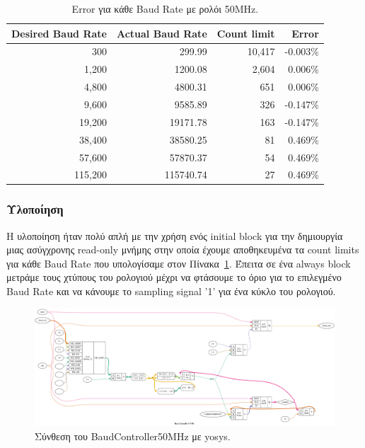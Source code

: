 \documentclass[../main.tex]{subfiles}
\begin{document}
\begin{table}[H]
  \renewcommand{\arraystretch}{1.3}
  \caption{Error για κάθε Baud Rate με ρολόι 50MHz.}
  \label{tab:baudrate}
  \centering
  \begin{tabular}{rrrr}
    \hline
    \bf Desired Baud Rate & \bf Actual Baud Rate & \bf Count limit & \bf Error \\
    \hline\hline
                      300 &               299.99 &          10,417 &    -0.003\% \\
                    1,200 &              1200.08 &           2,604 &     0.006\% \\
                    4,800 &              4800.31 &             651 &     0.006\% \\
                    9,600 &              9585.89 &             326 &    -0.147\% \\
                   19,200 &             19171.78 &             163 &    -0.147\% \\
                   38,400 &             38580.25 &              81 &     0.469\% \\
                   57,600 &             57870.37 &              54 &     0.469\% \\
                  115,200 &            115740.74 &              27 &     0.469\% \\
    \hline
  \end{tabular}
\end{table}

\subsubsection*{Υλοποίηση}

Η υλοποίηση ήταν πολύ απλή με την χρήση ενός initial block για την δημιουργία
μιας ασύγχρονης read-only μνήμης στην οποία έχουμε αποθηκευμένα τα count limits
για κάθε Baud Rate που υπολογίσαμε στον Πίνακα~\ref{tab:baudrate}. Έπειτα σε ένα
always block μετράμε τους χτύπους του ρολογιού μέχρι να φτάσουμε το όριο για το
επιλεγμένο Baud Rate και να κάνουμε το sampling signal '1' για ένα κύκλο του
ρολογιού.

\begin{figure}[H]
  \begin{center}
    \includegraphics[width=\textwidth]{../../diagrams/BaudController50MHz.png}
  \end{center}
  \caption{Σύνθεση του BaudController50MHz με yosys.}
\end{figure}
\end{document}
